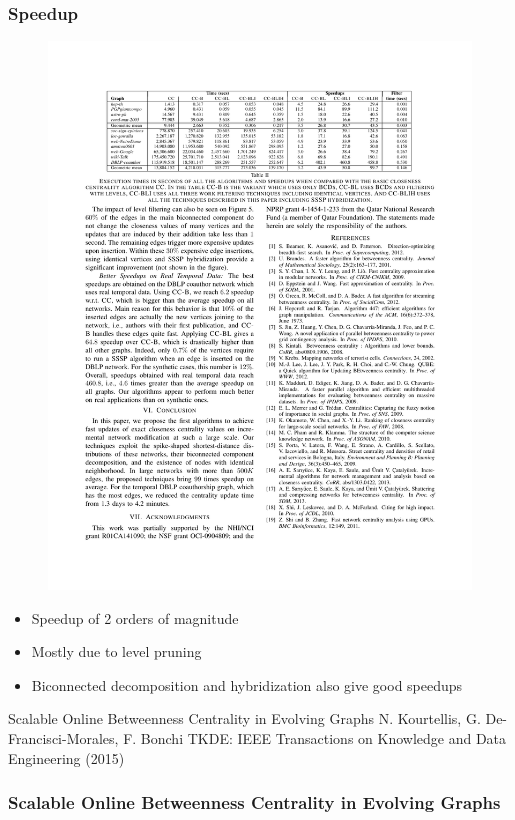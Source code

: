 \begin{frame}
  \frametitle{Speedup}

  \begin{figure}[H]
    \centering
    \includegraphics[width=\textwidth, height=0.5\textheight, keepaspectratio]{imgs/sksc-results2}
  \end{figure}

  \begin{itemize}
    \item Speedup of 2 orders of magnitude
    \item Mostly due to level pruning
    \item Biconnected decomposition and hybridization also give good speedups
  \end{itemize}
\end{frame}


\begin{frame}
  \centering
  \vfill
  {\huge Scalable Online Betweenness Centrality in Evolving Graphs}
  \vfill
  {\Large N. Kourtellis, G. De-Francisci-Morales, F. Bonchi}
  \vfill
  {\large TKDE: IEEE Transactions on Knowledge and Data Engineering (2015)}
  \frametitle{Scalable Online Betweenness Centrality in Evolving Graphs}
  \vfill
\end{frame}


